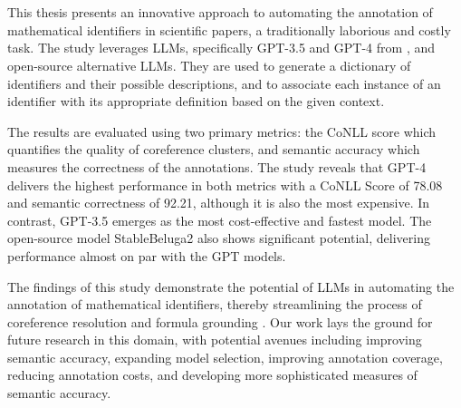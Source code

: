 \chapter{\abstractname}

This thesis presents an innovative approach to automating the annotation of mathematical identifiers in scientific papers, a traditionally laborious and costly task. The study leverages \ac{LLMs}, specifically GPT-3.5 and GPT-4 from \citet{openai2023}, and open-source alternative \ac{LLMs}. They are used to generate a dictionary of identifiers and their possible descriptions, and to associate each instance of an identifier with its appropriate definition based on the given context. 

The results are evaluated using two primary metrics: the CoNLL score \citep{pradhan2012conll} which quantifies the quality of coreference clusters, and semantic accuracy which measures the correctness of the annotations. The study reveals that GPT-4 delivers the highest performance in both metrics with a CoNLL Score of 78.08 and semantic correctness of 92.21, although it is also the most expensive. In contrast, GPT-3.5 emerges as the most cost-effective and fastest model. The open-source model StableBeluga2 \citep{StableBelugaModels, touvron2023llama, mukherjee2023orca} also shows significant potential, delivering performance almost on par with the GPT models.

The findings of this study demonstrate the potential of LLMs in automating the annotation of mathematical identifiers, thereby streamlining the process of coreference resolution and formula grounding \citep{asakura2020towards}. Our work lays the ground for future research in this domain, with potential avenues including improving semantic accuracy, expanding model selection, improving annotation coverage, reducing annotation costs, and developing more sophisticated measures of semantic accuracy.
